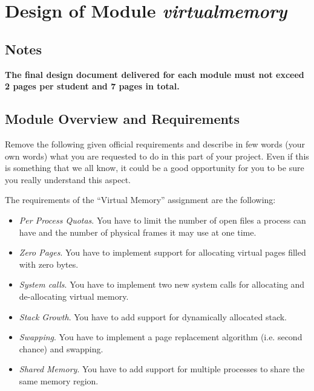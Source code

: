 
\chapter{Design of Module \textit{virtualmemory}}

\renewcommand{\taskA}{\textit{Per Process Quotas and Zero Pages}}
\renewcommand{\taskB}{\textit{System Calls and Stack Growth}}
\renewcommand{\taskC}{\textit{Swapping}}

\section*{Notes}

\textbf{The final design document delivered for each module must not exceed 2 pages per student and 7 pages in total.}

\section{Module Overview and Requirements}

Remove the following given official requirements and describe in few words (your own words) what you are requested to do in this part of your project. Even if this is something that we all know, it could be a good opportunity for you to be sure you really understand this aspect. 

The requirements of the ``Virtual Memory'' assignment are the following:
\begin{itemize}
    \item \textit{Per Process Quotas}. You have to limit the number of open files a process can have
and the number of physical frames it may use at one time.

    \item \textit{Zero Pages}. You have to implement support for allocating virtual pages filled with
zero bytes.

    \item \textit{System calls}. You have to implement two new system calls for allocating and
de-allocating virtual memory.

		\item \textit{Stack Growth}. You have to add support for dynamically allocated stack.

    \item \textit{Swapping}. You have to implement a page replacement algorithm (i.e. second chance)
and swapping.

		\item \textit{Shared Memory}. You have to add support for multiple processes to share the same memory region.

\end{itemize}


